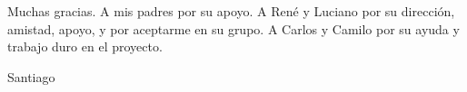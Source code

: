 


\begin{acknowledgements} 

Muchas gracias. A mis padres por su apoyo. A René y Luciano por su
dirección, amistad, apoyo, y por aceptarme en su grupo. A Carlos y
Camilo por su ayuda y trabajo duro en el proyecto.\\


\begin{flushright}

Santiago

\monthname \ \the\year







\end{flushright}



\end{acknowledgements}



